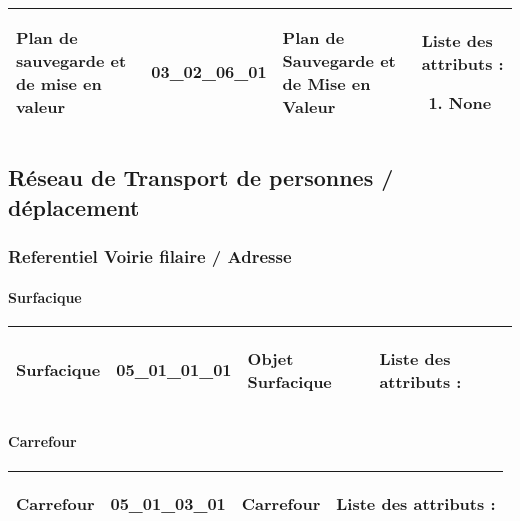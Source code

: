 \documentclass[12pt,titlepage,oneside]{book}
\begin{document}
\renewcommand{\arraystretch}{1.2}
\begin{supertabular}{|p{10cm}|c|p{13cm}|p{12cm}|}
 Plan de sauvegarde et de mise en valeur & 03\_02\_06\_01 & Plan de Sauvegarde et de Mise en Valeur & Liste des attributs :
\begin{enumerate}
  \item None\end{enumerate}
\\
\hline
\end{supertabular}
\begin{figure}[h!]
  \hfill         %
\end{figure}
\subsection{Réseau de Transport de personnes / déplacement}
\subsubsection{\large Referentiel Voirie filaire / Adresse}
\paragraph{Surfacique}
\noindent
\vspace{\baselineskip}

\renewcommand{\arraystretch}{1.2}
\begin{supertabular}{|p{10cm}|c|p{13cm}|p{12cm}|}
 Surfacique & 05\_01\_01\_01 & Objet Surfacique & Liste des attributs :
\begin{enumerate}
\end{enumerate}
\\
\hline
\end{supertabular}
\begin{figure}[h!]
  \hfill         %
\end{figure}


\paragraph{Carrefour}
\noindent
\vspace{\baselineskip}

\renewcommand{\arraystretch}{1.2}
\begin{supertabular}{|p{10cm}|c|p{13cm}|p{12cm}|}
 Carrefour & 05\_01\_03\_01 & Carrefour & Liste des attributs :
\begin{enumerate}
\end{enumerate}
\\
\hline
\end{supertabular}
\begin{figure}[h!]
  \hfill         %
\end{figure}
\end{document}
